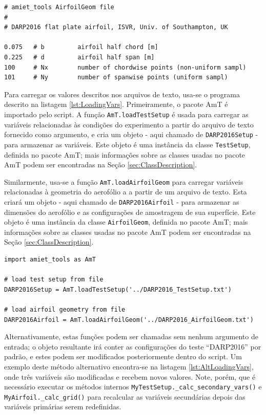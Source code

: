 \documentclass[a4paper, 11pt, twoside]{article}
\begin{document}
\begin{lstlisting}[caption={Arquivo \texttt{DARP2016\_AirfoilGeom.txt}}, label={lst:AirfoilGeom}]
# amiet_tools AirfoilGeom file
#
# DARP2016 flat plate airfoil, ISVR, Univ. of Southampton, UK

0.075	# b			airfoil half chord [m]
0.225	# d 		airfoil half span [m]
100		# Nx 		number of chordwise points (non-uniform sampl)
101		# Ny 		number of spanwise points (uniform sampl)
\end{lstlisting}

Para carregar os valores descritos nos arquivos de texto, usa-se o programa descrito na listagem \ref{lst:LoadingVars}. Primeiramente, o pacote AmT é importado pelo script. A função \verb|AmT.loadTestSetup| é usada para carregar as variáveis relacionadas às condições do experimento a partir do arquivo de texto fornecido como argumento, e cria um objeto - aqui chamado de \verb|DARP2016Setup| - para armazenar as variáveis. Este objeto é uma instância da classe \verb|TestSetup|, definida no pacote AmT; mais informações sobre as classes usadas no pacote AmT podem ser encontradas na Seção \ref{sec:ClassDescription}.

Similarmente, usa-se a função \verb|AmT.loadAirfoilGeom| para carregar variáveis relacionadas à geometria do aerofólio a a partir de um arquivo de texto. Esta criará um objeto - aqui chamado de \verb|DARP2016Airfoil| - para armazenar as dimensões do aerofólio e as configurações de amostragem de sua superfície. Este objeto é uma instância da classe \verb|AirfoilGeom|, definida no pacote AmT; mais informações sobre as classes usadas no pacote AmT podem ser encontradas na Seção \ref{sec:ClassDescription}.

\begin{lstlisting}[caption={Importando pacotes e carregando variáveis},label={lst:LoadingVars}]
import amiet_tools as AmT

# load test setup from file
DARP2016Setup = AmT.loadTestSetup('../DARP2016_TestSetup.txt')

# load airfoil geometry from file
DARP2016Airfoil = AmT.loadAirfoilGeom('../DARP2016_AirfoilGeom.txt')
\end{lstlisting}

Alternativamente, estas funções podem ser chamadas sem nenhum argumento de entrada; o objeto resultante irá conter as configurações do teste ``DARP2016'' por padrão, e estes podem ser modificados posteriormente dentro do script. Um exemplo deste método alternativo encontra-se na listagem \ref{lst:AltLoadingVars}, onde três variáveis são modificadas e recebem novos valores. Note, porém, que é necessário executar os métodos internos \verb|MyTestSetup._calc_secondary_vars()| e \verb|MyAirfoil._calc_grid()| para recalcular as variáveis secundárias depois das variáveis primárias serem redefinidas.
\end{document}
